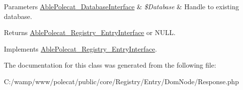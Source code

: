 \begin{DoxyParams}[1]{Parameters}
\hyperlink{interface_able_polecat___database_interface}{Able\+Polecat\+\_\+\+Database\+Interface} & {\em \$\+Database} & Handle to existing database.\\
\hline
\end{DoxyParams}
\begin{DoxyReturn}{Returns}
\hyperlink{interface_able_polecat___registry___entry_interface}{Able\+Polecat\+\_\+\+Registry\+\_\+\+Entry\+Interface} or N\+U\+L\+L. 
\end{DoxyReturn}


Implements \hyperlink{interface_able_polecat___registry___entry_interface_a999eef977eb899167ae02f83dd26a4ae}{Able\+Polecat\+\_\+\+Registry\+\_\+\+Entry\+Interface}.



The documentation for this class was generated from the following file\+:\begin{DoxyCompactItemize}
\item 
C\+:/wamp/www/polecat/public/core/\+Registry/\+Entry/\+Dom\+Node/Response.\+php\end{DoxyCompactItemize}

